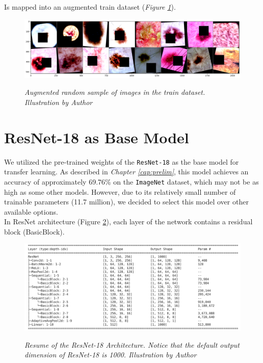 Is mapped into an augmented train dataset (\textit{Figure \ref{fig:aug-sample-of-datasets}}).

\begin{figure}[H]
\centering
\includegraphics[width=\textwidth]{imatges/methodological_contribution/random-sample-of-isic-augmented.png}
\caption[Augmented random sample of images in the train dataset]{\textit{Augmented random sample of images in the train dataset. Illustration by Author}}
{\label{fig:aug-sample-of-datasets}}
\end{figure}

\newpage

\section{ResNet-18 as Base Model}

We utilized the pre-trained weights of the {\tt ResNet-18} as the base model for transfer learning. As described in \textit{Chapter \ref{cap:prelim}}, this model achieves an accuracy of approximately 69.76\% on the {\tt ImageNet} dataset, which may not be as high as some other models. However, due to its relatively small number of trainable parameters (11.7 million), we decided to select this model over other available options. \\

In ResNet architecture (Figure \ref{fig:resnet-18-arch}), each layer of the network contains a residual block (BasicBlock).

\begin{figure}[H]
\begin{adjustbox}{width=\textwidth, trim={0.2cm 0pt 1.5cm 0pt}, clip}
\centering
\includegraphics[width=\textwidth]{imatges/methodological_contribution/residual-blocks.png}
\end{adjustbox}
\caption[Resume of the ResNet-18 Architecture]{\textit{Resume of the ResNet-18 Architecture. Notice that the default output dimension of ResNet-18 is 1000. Illustration by Author}}
{\label{fig:resnet-18-arch}}
\end{figure}

